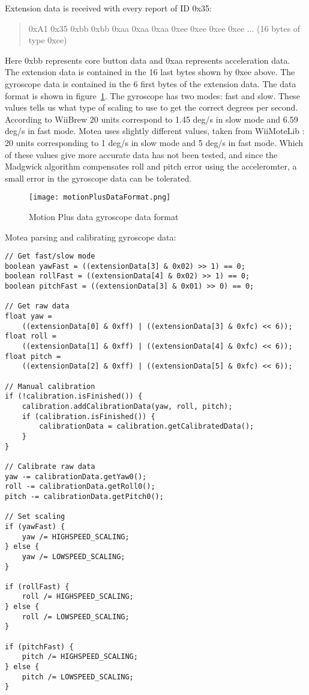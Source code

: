 Extension data is received with every report of ID 0x35:
\begin{quote}
0xA1 0x35 0xbb 0xbb 0xaa 0xaa 0xaa 0xee 0xee 0xee 0xee ... (16 bytes of type 0xee)
\end{quote}
Here 0xbb represents core button data and 0xaa represents acceleration data. The extension data is contained in the 16 last bytes shown by 0xee above. The gyroscope data is contained in the 6 first bytes of the extension data. The data format is shown in figure~\ref{fig:motionPlusDataFormat}. The gyroscope has two modes: fast and slow. These values tells us what type of scaling to use to get the correct degrees per second. According to WiiBrew \cite{wiiBrew} 20 units correspond to 1.45 deg/s in slow mode and 6.59 deg/s in fast mode. Motea uses slightly different values, taken from WiiMoteLib \cite{wiiMoteLib}: 20 units corresponding to 1 deg/s in slow mode and 5 deg/s in fast mode. Which of these values give more accurate data has not been tested, and since the Madgwick algorithm \cite{madgwick} compensates roll and pitch error using the acceleromter, a small error in the gyroscope data can be tolerated. 
\begin{figure}[h!]
  \centering
    \texttt{[image: motionPlusDataFormat.png]}
    \caption{\footnotesize Motion Plus data gyroscope data format}
    \label{fig:motionPlusDataFormat}
\end{figure}

Motea parsing and calibrating gyroscope data:
\begin{lstlisting}
// Get fast/slow mode
boolean yawFast = ((extensionData[3] & 0x02) >> 1) == 0;
boolean rollFast = ((extensionData[4] & 0x02) >> 1) == 0;
boolean pitchFast = ((extensionData[3] & 0x01) >> 0) == 0;

// Get raw data
float yaw = 
	((extensionData[0] & 0xff) | ((extensionData[3] & 0xfc) << 6));
float roll = 
	((extensionData[1] & 0xff) | ((extensionData[4] & 0xfc) << 6));
float pitch = 
	((extensionData[2] & 0xff) | ((extensionData[5] & 0xfc) << 6));

// Manual calibration
if (!calibration.isFinished()) {
	calibration.addCalibrationData(yaw, roll, pitch);
	if (calibration.isFinished()) {
		calibrationData = calibration.getCalibratedData();
	}
}

// Calibrate raw data
yaw -= calibrationData.getYaw0();
roll -= calibrationData.getRoll0();
pitch -= calibrationData.getPitch0();

// Set scaling
if (yawFast) {
	yaw /= HIGHSPEED_SCALING;
} else {
	yaw /= LOWSPEED_SCALING;
}

if (rollFast) {
	roll /= HIGHSPEED_SCALING;
} else {
	roll /= LOWSPEED_SCALING;
}

if (pitchFast) {
	pitch /= HIGHSPEED_SCALING;
} else {
	pitch /= LOWSPEED_SCALING;
}
\end{lstlisting}
